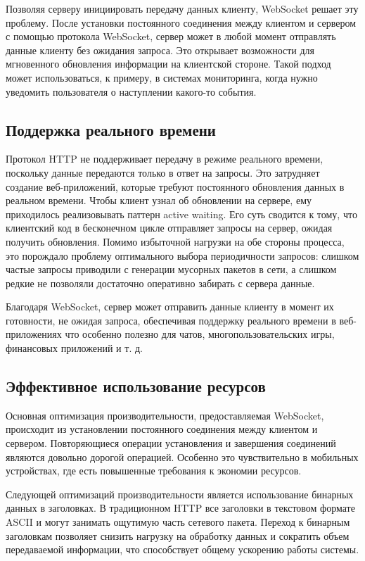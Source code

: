 Позволяя серверу инициировать передачу данных клиенту, WebSocket решает эту проблему. После установки постоянного соединения между клиентом и сервером с помощью протокола WebSocket, сервер может в любой момент отправлять данные клиенту без ожидания запроса. Это открывает возможности для мгновенного обновления информации на клиентской стороне. Такой подход может использоваться, к примеру, в системах мониторинга, когда нужно уведомить пользователя о наступлении какого-то события.

\subsection{Поддержка реального времени}

Протокол HTTP не поддерживает передачу в режиме реального времени, поскольку данные передаются только в ответ на запросы. Это затрудняет создание веб-приложений, которые требуют постоянного обновления данных в реальном времени. Чтобы клиент узнал об обновлении на сервере, ему приходилось реализовывать паттерн active waiting. Его суть сводится к тому, что клиентский код в бесконечном цикле отправляет запросы на сервер, ожидая получить обновления. Помимо избыточной нагрузки на обе стороны процесса, это порождало проблему оптимального выбора периодичности запросов: слишком частые запросы приводили с генерации мусорных пакетов в сети, а слишком редкие не позволяли достаточно оперативно забирать с сервера данные.

Благодаря WebSocket, сервер может отправить данные клиенту в момент их готовности, не ожидая запроса, обеспечивая поддержку реального времени в веб-приложениях что особенно полезно для чатов, многопользовательских игры, финансовых приложений и т. д.

\subsection{Эффективное использование ресурсов}

Основная оптимизация производительности, предоставляемая WebSocket, происходит из установлении постоянного соединения между клиентом и сервером. Повторяющиеся операции установления и завершения соединений являются довольно дорогой операцией. Особенно это чувствительно в мобильных устройствах, где есть повышенные требования к экономии ресурсов.

Следующей оптимизаций производительности является использование бинарных данных в заголовках. В традиционном HTTP все заголовки в текстовом формате ASCII и могут занимать ощутимую часть сетевого пакета. Переход к бинарным заголовкам позволяет снизить нагрузку на обработку данных и сократить объем передаваемой информации, что способствует общему ускорению работы системы.

